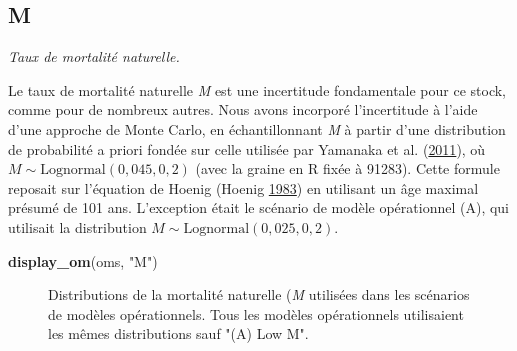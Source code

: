 \documentclass[11pt]{book}
\newenvironment{Shaded}{\begin{snugshade}}{\end{snugshade}}
\newcommand{\CommentTok}[1]{\textcolor[rgb]{0.56,0.35,0.01}{\textit{#1}}}
\newcommand{\DecValTok}[1]{\textcolor[rgb]{0.00,0.00,0.81}{#1}}
\newcommand{\FloatTok}[1]{\textcolor[rgb]{0.00,0.00,0.81}{#1}}
\newcommand{\KeywordTok}[1]{\textcolor[rgb]{0.13,0.29,0.53}{\textbf{#1}}}
\newcommand{\NormalTok}[1]{#1}
\newcommand{\OperatorTok}[1]{\textcolor[rgb]{0.81,0.36,0.00}{\textbf{#1}}}
\newcommand{\StringTok}[1]{\textcolor[rgb]{0.31,0.60,0.02}{#1}}
\begin{document}
\subsection{M}

\emph{Taux de mortalité naturelle.}

Le taux de mortalité naturelle \emph{M} est une incertitude fondamentale pour ce stock, comme pour de nombreux autres. Nous avons incorporé l'incertitude à l'aide d'une approche de Monte Carlo, en échantillonnant \emph{M} à partir d'une distribution de probabilité a priori fondée sur celle utilisée par Yamanaka et al. (\protect\hyperlink{ref-yamanaka2011}{2011}), où \(M \sim \textrm{Lognormal}(0,045, 0,2)\) (avec la graine en R fixée à 91283). Cette formule reposait sur l'équation de Hoenig (Hoenig \protect\hyperlink{ref-hoenig1983}{1983}) en utilisant un âge maximal présumé de 101 ans. L'exception était le scénario de modèle opérationnel (A), qui utilisait la distribution \(M \sim \textrm{Lognormal}(0,025, 0,2)\).
\begin{Shaded}
\end{Shaded}
\begin{Shaded}
\begin{Highlighting}[]
\KeywordTok{display_om}\NormalTok{(oms, }\StringTok{"M"}\NormalTok{)}
\end{Highlighting}
\end{Shaded}
\begin{figure}[htb]

{\centering {} 

}

\caption{Distributions de la mortalité naturelle (\emph{M} utilisées dans les scénarios de modèles opérationnels. Tous les modèles opérationnels utilisaient les mêmes distributions sauf "(A) Low M".}\label{fig:desc-stock-m-yelloweye}
\end{figure}
\label{app:desc-stock-h-yelloweye}
\end{document}
